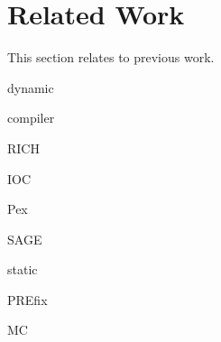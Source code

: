 \section{Related Work}
\label{s:relwk}

This section relates \sys to previous work.

dynamic

compiler

RICH~\cite{brumley:rich}

IOC

Pex

SAGE

static

PREfix~\cite{moy:prefix}

MC
